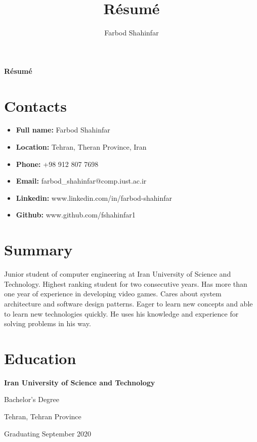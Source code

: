 \documentclass{article}
\begin{document}
\title{R\'esum\'e}
\author{Farbod Shahinfar}

\begin{center}
        {
                \huge\bfseries
                R\'esum\'e
        }
\end{center}

\section{Contacts}
\begin{multicols}{2}
\begin{itemize}
        \item{\textbf{Full name:} Farbod Shahinfar}
        \item{\textbf{Location:} Tehran, Theran Province, Iran}
        \item{\textbf{Phone:} +98 912 807 7698}
        \item{\textbf{Email:} farbod\_shahinfar@comp.iust.ac.ir}
        \item{\textbf{Linkedin:} www.linkedin.com/in/farbod-shahinfar}
        \item{\textbf{Github:} www.github.com/fshahinfar1}
\end{itemize}
\end{multicols}

\section{Summary}
Junior student of computer engineering at Iran University of Science and Technology. Highest ranking student for two consecutive years. Has more than one year of experience in developing video games. Cares about system architecture and software design patterns. Eager to learn new concepts and able to learn new technologies quickly. He uses his knowledge and experience for solving problems in his way.

\section{Education}
\begin{multicols}{2}
\noindent \textbf{Iran University of Science and Technology} \par
Bachelor's Degree \par
Tehran, Tehran Province \par
Graduating September 2020 \par
\par
\end{multicols}
\end{document}
